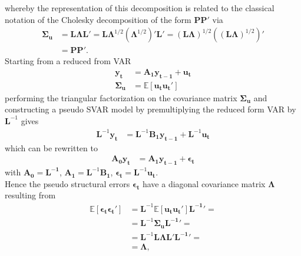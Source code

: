 \documentclass[a4paper,11pt,listof=nochaptergap,oneside,pointednumbers,bibtotoc,bigheadings,liststotoc]{scrbook}
\newcommand{\vect}[1]{\boldsymbol{\mathbf{#1}}}
\begin{document}
whereby the representation of this decomposition is related to the classical notation of the Cholesky decomposition of the form $\vect{PP'}$ via
\begin{equation} \label{eq:svar17}
\begin{split}
	\vect{\Sigma_u} & = \vect{L}\vect{\Lambda}\vect{L}' = \vect{L}\vect{\Lambda}^{1/2}(\vect{\Lambda}^{1/2})'\vect{L}' = (\vect{L}\vect{\Lambda})^{1/2}\left ( (\vect{L}\vect{\Lambda})^{1/2}\right )' \\
				& = \vect{P}\vect{P'}.
\end{split}								
\end{equation}
Starting from a reduced from VAR
\begin{equation} \label{eq:svar18}
\begin{split}
	\vect{y_t} & = \vect{A_1}\vect{y_{t-1}} + \vect{u_t} \\
	\vect{\Sigma_u} & = \mathbb{E}[\vect{u_t}\vect{u_t}']
\end{split}								
\end{equation}
performing the triangular factorization on the covariance matrix $\vect{\Sigma_u}$ and constructing a pseudo SVAR model by premultiplying the reduced form VAR by $\vect{L}^{-1}$ gives
\begin{equation} \label{eq:svar19}
\begin{split}
	\vect{L}^{-1}\vect{y_t} & = \vect{L}^{-1}\vect{B_1}\vect{y_{t-1}} + \vect{L}^{-1}\vect{u_t}
\end{split}								
\end{equation}
which can be rewritten to
\begin{equation} \label{eq:svar21}
\begin{split}
	\vect{A_0}\vect{y_t} & = \vect{A_1}\vect{y_{t-1}} + \vect{\epsilon_t}
\end{split}								
\end{equation}
with $\vect{A_0} = \vect{L^{-1}}$, $\vect{A_1} = \vect{L}^{-1}\vect{B_1}$, $\vect{\epsilon_t} = \vect{L}^{-1}\vect{u_t}$.\\
Hence the pseudo structural errors $\vect{\epsilon_t}$ have a diagonal covariance matrix $\vect{\Lambda}$ resulting from 
\begin{equation} \label{eq:svar22}
\begin{split}
	\mathbb{E}[\vect{\epsilon_t}\vect{\epsilon_t}'] & = \vect{L}^{-1} \mathbb{E}[\vect{u_t}\vect{u_t}']\vect{L^{-1}}' = \\
										& = \vect{L}^{-1} \vect{\Sigma_u} \vect{L^{-1}}' = \\
										& = \vect{L}^{-1} \vect{L \Lambda L}' \vect{L^{-1}}' = \\
										& = \vect{\Lambda},
\end{split}								
\end{equation}
\end{document}

